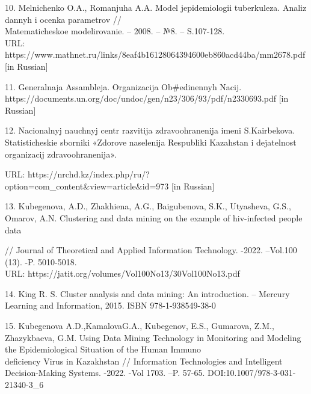 \begin{noparindent}
10. Mel\textquotesingle nichenko O.A., Romanjuha A.A.
Model\textquotesingle{} jepidemiologii tuberkuleza. Analiz dannyh i
ocenka parametrov // \\Matematicheskoe modelirovanie. -- 2008. -- №8. --
S.107-128. \\URL:
https://www.mathnet.ru/links/8eaf4b16128064394600eb860acd44ba/mm2678.pdf
{[}in Russian{]}

11. General\textquotesingle naja Assambleja. Organizacija Ob\#edinennyh
Nacij.
\\https://documents.un.org/doc/undoc/gen/n23/306/93/pdf/n2330693.pdf {[}in
Russian{]}

12. Nacional\textquotesingle nyj nauchnyj centr razvitija
zdravoohranenija imeni S.Kairbekova. Statisticheskie sborniki
«Zdorov\textquotesingle e naselenija Respubliki Kazahstan i
dejatel\textquotesingle nost\textquotesingle{} organizacij
zdravoohranenija».

URL:
https://nrchd.kz/index.php/ru/?option=com\_content\&view=article\&id=973
{[}in Russian{]}

13. Kubegenova, A.D., Zhakhiena, A.G., Baigubenova, S.K., Utyasheva,
G.S., Omarov, A.N. Clustering and data mining on the example of
hiv-infected people data

// Journal of Theoretical and Applied Information Technology. -2022.
--Vol.100 (13). -P. 5010-5018.\\ URL:
https://jatit.org/volumes/Vol100No13/30Vol100No13.pdf

14. King R. S. Cluster analysis and data mining: An introduction. --
Mercury Learning and Information, 2015. ISBN 978-1-938549-38-0

15. Kubegenova A.D.,KamalovaG.A., Kubegenov, E.S., Gumarova, Z.M.,
Zhazykbaeva, G.M. Using Data Mining Technology in Monitoring and
Modeling the Epidemiological Situation of the Human Immuno\\deficiency
Virus in Kazakhstan // Information Technologies and Intelligent
Decision-Making Systems. -2022. -Vol 1703. --P. 57-65.
DOI:10.1007/978-3-031-21340-3\_6
\end{noparindent}


